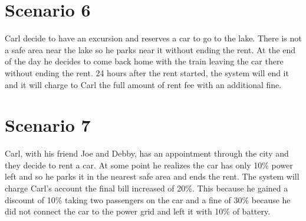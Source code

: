 \section{Scenario 6}
Carl decide to have an excursion and reserves a car to go to the lake. There is not a safe area near the lake so he parks near it without ending the rent. At the end of the day he decides to come back home with the train leaving the car there without ending the rent. 24 hours after the rent started, the system will end it and it will charge to Carl the full amount of rent fee with an additional fine.
\section{Scenario 7}
Carl, with his friend Joe and Debby, has an appointment through the city and they decide to rent a car. At some point he realizes the car has only 10\% power left and so he parks it in the nearest safe area and ends the rent. The system will charge Carl's account the final bill increased of 20\%. This because he gained a discount of 10\% taking two passengers on the car and a fine of 30\% because he did not connect the car to the power grid and left it with 10\% of battery.